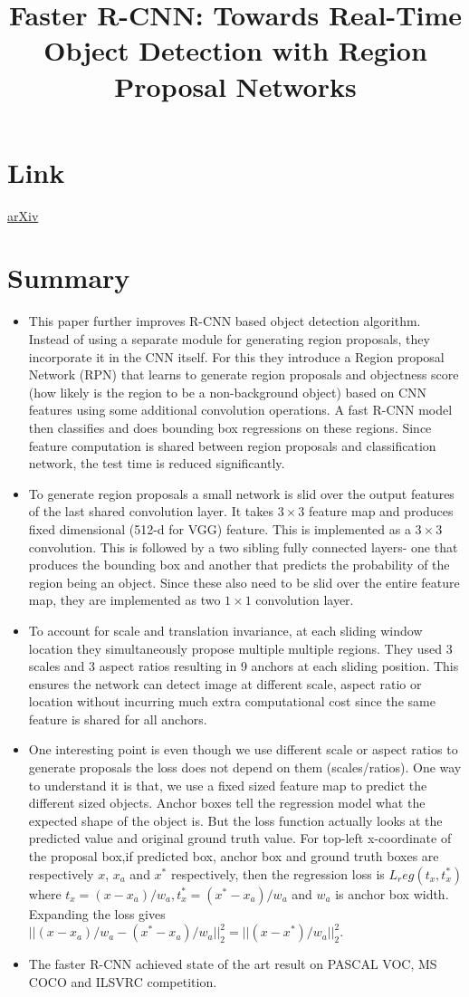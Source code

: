 \documentclass{article}
\title{Faster R-CNN: Towards Real-Time Object Detection with Region Proposal Networks}
\author{}
\date{}
\begin{document}
\maketitle

\section*{Link}
\href{https://arxiv.org/abs/1506.01497}{arXiv} 

\section*{Summary}
\begin{itemize}
    \item This paper further improves R-CNN based object detection algorithm. Instead of using a separate module for generating region proposals, they incorporate it in the CNN itself. For this they introduce a Region proposal Network (RPN) that learns to generate region proposals and objectness score (how likely is the region to be a non-background object) based on CNN features using some additional convolution operations. A fast R-CNN model then classifies and does bounding box regressions on these regions. Since feature computation is shared between region proposals and classification network, the test time is reduced significantly. 
    \item To generate region proposals a small network is slid over the output features of the last shared convolution layer. It takes $3\times 3$ feature map and produces fixed dimensional (512-d for VGG) feature. This is implemented as a $3\times 3$ convolution. This is followed by a two sibling fully connected layers- one that produces the bounding box and another that predicts the probability of the region being an object. Since these also need to be slid over the entire feature map, they are implemented as two $1\times 1$ convolution layer.
    \item To account for scale and translation invariance, at each sliding window location they simultaneously propose multiple multiple regions. They used 3 scales and 3 aspect ratios resulting in 9 anchors at each sliding position. This ensures the network can detect image at different scale, aspect ratio or location without incurring much extra computational cost since the same feature is shared for all anchors.
    \item One interesting point is even though we use different scale or aspect ratios to generate proposals the loss does not depend on them (scales/ratios). One way to understand it is that, we use a fixed sized feature map to predict the different sized objects. Anchor boxes tell the regression model what the expected shape of the object is. But the loss function actually looks at the predicted value and original ground truth value. For top-left x-coordinate of the proposal box,if predicted box, anchor box and ground truth boxes are respectively $x$, $x_a$ and $x^*$ respectively, then the regression loss is $L_reg(t_x, t_x^*)$ where $t_x = (x-x_a)/w_a, t_x^*=(x^*-x_a)/w_a$ and $w_a$ is anchor box width. Expanding the loss gives $||(x-x_a)/w_a -(x^*-x_a)/w_a||_2^2 = ||(x-x^*)/w_a||_2^2$.
    \item The faster R-CNN achieved state of the art result on PASCAL VOC, MS COCO and ILSVRC competition. 
\end{itemize}
\end{document}
